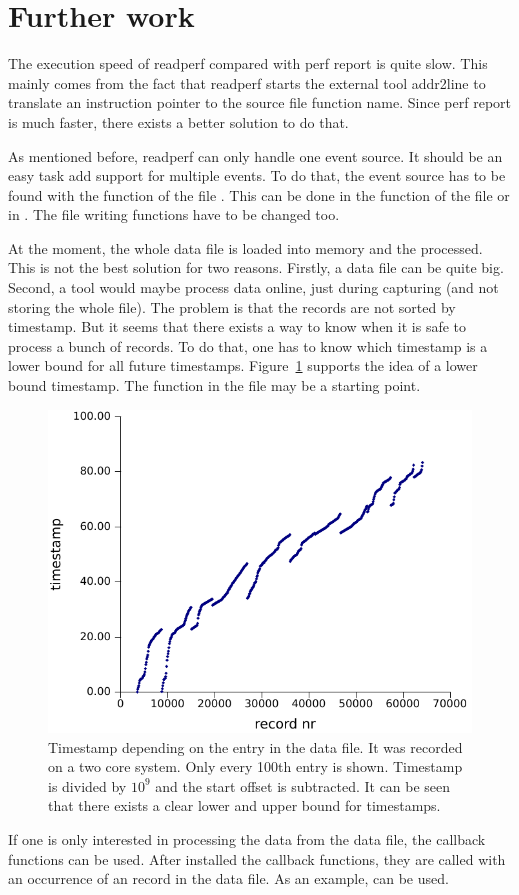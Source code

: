 \section{Further work}
The execution speed of readperf compared with perf report is quite slow. This mainly comes from the fact that readperf starts the external tool addr2line to translate an instruction pointer to the source file function name. Since perf report is much faster, there exists a better solution to do that.

As mentioned before, readperf can only handle one event source. It should be an easy task add support for multiple events. To do that, the event source has to be found with the function  of the file . This can be done in the function  of the file  or  in . The file writing functions have to be changed too.

At the moment, the whole data file is loaded into memory and the processed. This is not the best solution for two reasons. Firstly, a data file can be quite big. Second, a tool would maybe process data online, just during capturing (and not storing the whole file).
The problem is that the records are not sorted by timestamp. But it seems that there exists a way to know when it is safe to process a bunch of records. To do that, one has to know which timestamp is a lower bound for all future timestamps. Figure~\ref{fig:timeRecord} supports the idea of a lower bound timestamp. The function  in the file  may be a starting point.

\begin{figure}[ht]
  \center
  \includegraphics[scale=0.9]{res/timeRecord}
  \caption[Timestamp depending on the entry in the data file]{Timestamp depending on the entry in the data file. It was recorded on a two core system.  Only every 100th entry is shown. Timestamp is divided by $10^9$ and the start offset is subtracted. It can be seen that there exists a clear lower and upper bound for timestamps.\label{fig:timeRecord}}
\end{figure}

If one is only interested in processing the data from the data file, the callback functions can be used. After installed the callback functions, they are called with an occurrence of an record in the data file. As an example,  can be used.
